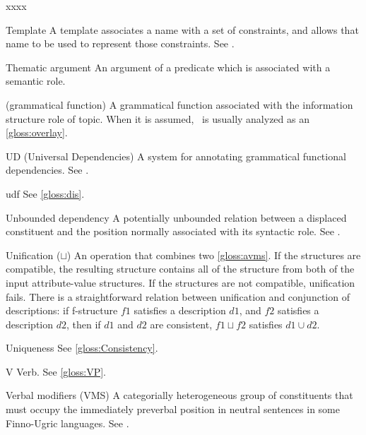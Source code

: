 \documentclass[output=paper,colorlinks,citecolor=brown]{langscibook}
\begin{document}
\begin{labeling}{xxxx}
\item[Template\namedlabel{gloss:template}{template}\namedlabel{gloss:templates}{templates}] A template associates a name with a set of constraints, and allows that name to be used to represent those constraints.  See \citetv[\ref{sec:CoreConcepts:templates}]{chapters/CoreConcepts}.

\item[Thematic argument\namedlabel{gloss:thematicarguments}{thematic arguments}] An argument of a predicate which is associated with a semantic role.

\item[\TOPIC\namedlabel{gloss:topic}{\TOPIC}] (grammatical function) A grammatical function associated with the information structure role of topic.  When it is assumed, \TOPIC\ is usually analyzed as an \ref{gloss:overlay}.

\item[UD (Universal Dependencies)] A system for annotating grammatical functional dependencies.  See .

\item[udf] See \ref{gloss:dis}.

\item[Unbounded dependency\namedlabel{gloss:UBD}{Unbounded dependency}\namedlabel{gloss:ubd}{unbounded dependency}] A potentially unbounded relation between a displaced constituent and the position normally associated with its syntactic role.  See .

\item[Unification ($\sqcup$)\namedlabel{gloss:unification}{unification}] An operation that combines two \ref{gloss:avms}.  If the structures are compatible, the resulting structure contains all of the structure from both of the input attribute-value structures.  If the structures are not compatible, unification fails. There is a straightforward relation between unification and conjunction of descriptions: if f-structure $f1$ satisfies a description $d1$, and $f2$ satisfies a description $d2$, then if $d1$ and $d2$ are consistent, $f1 \sqcup f2$ satisfies $d1 \cup d2$.

\item[Uniqueness] See \ref{gloss:Consistency}.

\item[V] Verb. See \ref{gloss:VP}.

\item[Verbal modifiers (VMS)] A categorially heterogeneous group of constituents that must occupy the immediately preverbal position in neutral sentences in some Finno-Ugric languages. See \citet{chapters/FinnoUgric}.


\end{labeling}
\end{document}
